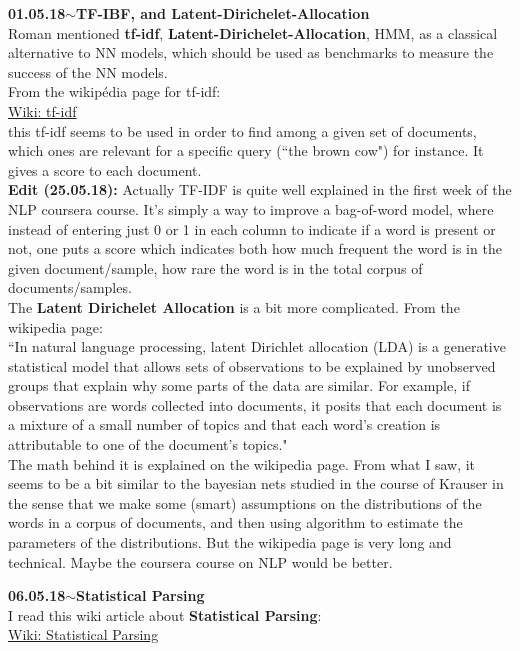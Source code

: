 \documentclass[11pt,a4paper]{article}
\newenvironment{loggentry}[2]%
{\noindent\textbf{#1}\hspace{1cm}$\mathbf{\sim}$\text{ }\textbf{#2}\\}{\vspace{0.5cm}}
\begin{document}
\begin{loggentry}{01.05.18}{TF-IBF, and Latent-Dirichelet-Allocation}
Roman mentioned \textbf{tf-idf}, \textbf{Latent-Dirichelet-Allocation}, HMM, as a classical alternative to NN models, which should be used as benchmarks to measure the success of the NN models.\\
From the wikipédia page for tf-idf:\\
\href{https://en.wikipedia.org/wiki/Tf-idf}{Wiki: tf-idf}\\
this tf-idf seems to be used in order to find among a given set of documents, which ones are relevant for a specific query (``the brown cow") for instance. It gives a score to each document.\\
\textbf{Edit (25.05.18):} Actually TF-IDF is quite well explained in the first week of the NLP coursera course. It's simply a way to improve a bag-of-word model, where instead of entering just 0 or 1 in each column to indicate if a word is present or not, one puts a score which indicates both how much frequent the word is in the given document/sample, how rare the word is in the total corpus of documents/samples.\\

The \textbf{Latent Dirichelet Allocation} is a bit more complicated. From the wikipedia page:\\
``In natural language processing, latent Dirichlet allocation (LDA) is a generative statistical model that allows sets of observations to be explained by unobserved groups that explain why some parts of the data are similar. For example, if observations are words collected into documents, it posits that each document is a mixture of a small number of topics and that each word's creation is attributable to one of the document's topics."\\
The math behind it is explained on the wikipedia page. From what I saw, it seems to be a bit similar to the bayesian nets studied in the course of Krauser in the sense that we make some (smart) assumptions on the distributions of the words in a corpus of documents, and then using algorithm to estimate the parameters of the distributions. But the wikipedia page is very long and technical. Maybe the coursera course on NLP would be better.
\end{loggentry}

\begin{loggentry}{06.05.18}{Statistical Parsing}
I read this wiki article about \textbf{Statistical Parsing}:\\
\href{https://en.wikipedia.org/wiki/Statistical_parsing}{Wiki: Statistical Parsing}\\
\end{loggentry}
\end{document}
